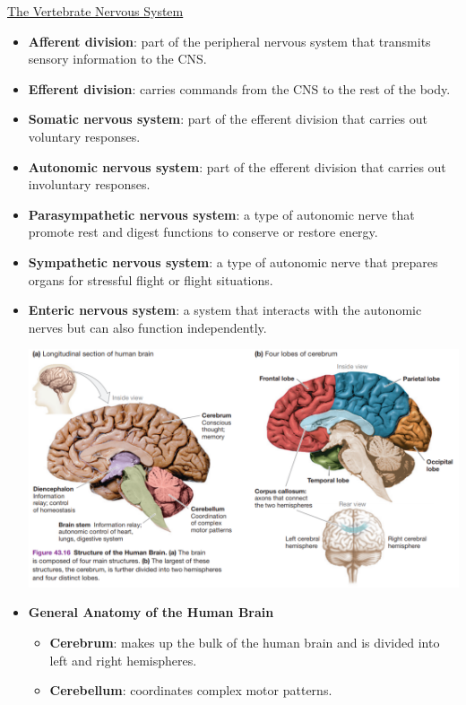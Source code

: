 \documentclass[12pt,letterpaper]{article}
\begin{document}
\hypertarget{43.4}{}
\begin{secbox}{\hyperlink{43}{The Vertebrate Nervous System}}{
    \begin{itemize}
        \item \textbf{Afferent division}: part of the peripheral nervous system that transmits sensory information to the CNS.
        \item \textbf{Efferent division}: carries commands from the CNS to the rest of the body.
        \item \textbf{Somatic nervous system}: part of the efferent division that carries out voluntary responses.
        \item \textbf{Autonomic nervous system}: part of the efferent division that carries out involuntary responses.
        \item \textbf{Parasympathetic nervous system}: a type of autonomic nerve that promote rest and digest functions to conserve or restore energy.
        \item \textbf{Sympathetic nervous system}: a type of autonomic nerve that prepares organs for stressful flight or flight situations. 
        \item \textbf{Enteric nervous system}: a system that interacts with the autonomic nerves but can also function independently. \par 
        \includegraphics[width=\linewidth]{images/fig43-16.png}
        \item \textbf{General Anatomy of the Human Brain }
            \begin{itemize}
                \item \textbf{Cerebrum}: makes up the bulk of the human brain and is divided into left and right hemispheres.
                \item \textbf{Cerebellum}: coordinates complex motor patterns.

\end{itemize}
\end{itemize}}
\end{secbox}
\end{document}
